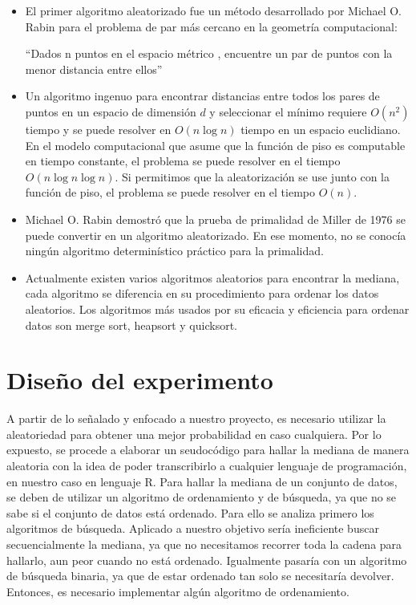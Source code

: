 \documentclass[final,a4paper,romanappendices]{IEEEtran}\usepackage[]{graphicx}\usepackage[]{color}
\theoremstyle{definition}
\begin{document}
\begin{itemize}
  \item El primer algoritmo aleatorizado fue un método desarrollado por Michael O. Rabin para el problema de par más cercano en la geometría computacional:

{\centering
``Dados n puntos en el espacio métrico , encuentre un par de puntos con la menor distancia entre ellos''\par
}
  \item Un algoritmo ingenuo para encontrar distancias entre todos los pares de puntos en un espacio de dimensión $d$ y seleccionar el mínimo requiere $O(n^2)$ tiempo y se puede resolver en $O(n\log n)$ tiempo en un espacio euclidiano. En el modelo computacional que
asume que la función de piso es computable en tiempo constante, el problema se puede resolver en el tiempo $O(n\log n\log n)$. Si permitimos que la aleatorización se use junto con la función de piso, el problema se puede resolver en el tiempo $O(n)$.
  \item Michael O. Rabin demostró que la prueba de primalidad de Miller de 1976 se puede convertir en un algoritmo aleatorizado. En ese momento, no se conocía ningún algoritmo determinístico práctico para la primalidad.
  \item Actualmente existen varios algoritmos aleatorios para encontrar la mediana, cada algoritmo se diferencia en su procedimiento para ordenar los datos aleatorios. Los algoritmos más usados por su eficacia y eficiencia para ordenar datos son merge sort, heapsort y quicksort.
\end{itemize}

\section{Diseño del experimento}

A partir de lo señalado y enfocado a nuestro proyecto, es necesario utilizar la aleatoriedad para obtener una mejor probabilidad en caso cualquiera. Por lo expuesto, se procede a elaborar un seudocódigo para hallar la mediana de manera aleatoria con la idea de poder transcribirlo a cualquier lenguaje de programación, en nuestro caso en lenguaje R. Para hallar la mediana de un conjunto de datos, se deben de utilizar un algoritmo de ordenamiento y de búsqueda, ya que no se sabe si el conjunto de datos está ordenado. Para ello se analiza primero los algoritmos de búsqueda.
\newline
Aplicado a nuestro objetivo sería ineficiente buscar secuencialmente la mediana, ya que no necesitamos recorrer toda la cadena para hallarlo, aun peor cuando no está ordenado. Igualmente pasaría con un algoritmo de búsqueda binaria, ya que de estar ordenado tan solo se necesitaría devolver. Entonces, es necesario implementar algún algoritmo de ordenamiento.
\end{document}
